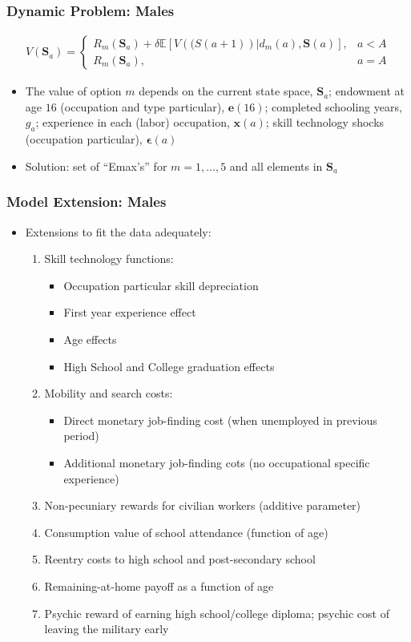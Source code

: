 \begin{frame}
	\frametitle{Dynamic Problem: Males}
	\begin{eqnarray}
	V(\mathbf{S}_{a}) =
		\begin{cases}
			R_{m} (\mathbf{S}_{a}) + \delta \mathbb{E} \left[ V (\mathbf(S(a+1)) | d_{m}(a), \mathbf{S}(a) \right], & a < A \nonumber \\
			R_{m} (\mathbf{S}_{a}) \nonumber, & a = A
		\end{cases}
	\end{eqnarray}
	\begin{itemize}
		\item The value of option $m$ depends on the current state space, $\mathbf{S}_a$; endowment at age $16$ (occupation and type particular), $\mathbf{e}(16)$; completed schooling years, $g_{a}$; experience in each (labor) occupation, $\mathbf{x}(a)$; skill technology shocks (occupation particular), $\mathbf{\epsilon}(a)$
		\item Solution: set of ``Emax's'' for $m = 1, \ldots, 5$ and all elements in $\mathbf{S}_a$
	\end{itemize}
\end{frame}

\begin{frame}
	\frametitle{Model Extension: Males}
	\begin{itemize}
		\item Extensions to fit the data adequately:
		\begin{enumerate}
		\item Skill technology functions:
			\begin{itemize}
				\item Occupation particular skill depreciation
				\item First year experience effect
				\item Age effects
				\item High School and College graduation effects
			\end{itemize}
		\item Mobility and search costs:
			\begin{itemize}
				\item Direct monetary job-finding cost (when unemployed in previous period)
				\item Additional monetary job-finding cots (no occupational specific experience)
			\end{itemize}
		\item Non-pecuniary rewards for civilian workers (additive parameter)
		\item Consumption value of school attendance (function of age)
		\item Reentry costs to high school and post-secondary school
		\item Remaining-at-home payoff as a function of age
		\item Psychic reward of earning high school/college diploma; psychic cost of leaving the military early
		\end{enumerate}
	\end{itemize}
\end{frame}

